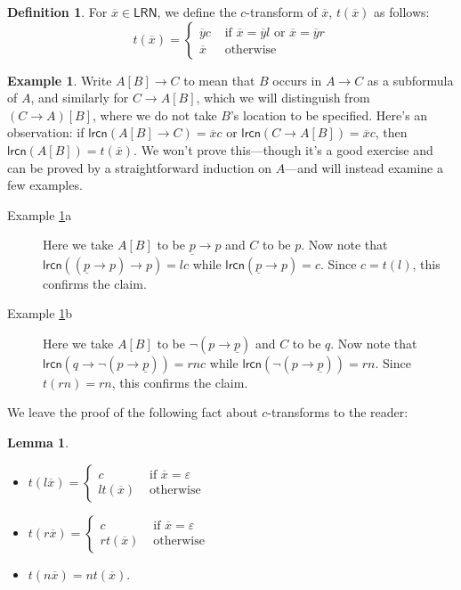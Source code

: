 \documentclass{amsart}
\theoremstyle{definition}
\newtheorem{lemma}{Lemma}
\newtheorem{ex}{Example}
\newtheorem{mdef}{Definition}
\newcommand{\LRN}{\mathsf{LRN}}
\newcommand{\lrcn}{\mathsf{lrcn}}
\begin{document}
\begin{mdef}
    For $\overline{x}\in\LRN$, we define the $c$-transform of $\overline{x}$, $t(\overline{x})$ as follows:
    \begin{displaymath}
        t(\overline{x})=
            \left\{\begin{array}{rl}
                \overline{y}c & \text{ if }\overline{x}=\overline{y}l\text{ or }\overline{x}=\overline{y}r \\
                \overline{x} & \text{ otherwise}
            \end{array}\right.
    \end{displaymath}
\end{mdef}

\begin{ex}\label{t_example}
    Write $A[B]\to C$ to mean that $B$ occurs in $A\to C$ as a subformula of $A$, and similarly for $C\to A[B]$, which we will distinguish from $(C\to A)[B]$, where we do not take $B$'s location to be specified. Here's an observation: if $\lrcn(A[B]\to C)=\overline{x}c$ or $\lrcn(C\to A[B])=\overline{x}c$, then $\lrcn(A[B])=t(\overline{x})$. We won't prove this---though it's a good exercise and can be proved by a straightforward induction on $A$---and will instead examine a few examples. 
    \begin{description}
        \item[Example \ref{t_example}a] Here we take $A[B]$ to be $\underline{p}\to p$ and $C$ to be $p$. Now note that $\lrcn((\underline{p}\to p)\to p)=lc$ while $\lrcn(\underline{p}\to p)=c$. Since $c=t(l)$, this confirms the claim.
        \item[Example \ref{t_example}b] Here we take $A[B]$ to be $\neg(p\to\underline{p})$ and $C$ to be $q$. Now note that $\lrcn(q\to\neg(p\to\underline{p}))=rnc$ while $\lrcn(\neg(p\to\underline{p}))=rn$. Since $t(rn)=rn$, this confirms the claim.
    \end{description}
\end{ex}

We leave the proof of the following fact about $c$-transforms to the reader:

\begin{lemma}\mbox{}
    \begin{itemize}
        \item 
        $t(l\overline{x})=\left\{\begin{array}{rl}
        c & \text{ if }\overline{x}=\varepsilon \\
        lt(\overline{x}) & \text{ otherwise }
        \end{array}\right.$ 
        \item 
        $t(r\overline{x})=\left\{\begin{array}{rl}
        c & \text{ if }\overline{x}=\varepsilon \\
        rt(\overline{x}) & \text{ otherwise }
        \end{array}\right.$
        \item $t(n\overline{x})=nt(\overline{x})$.
    \end{itemize}
\end{lemma}
\end{document}
